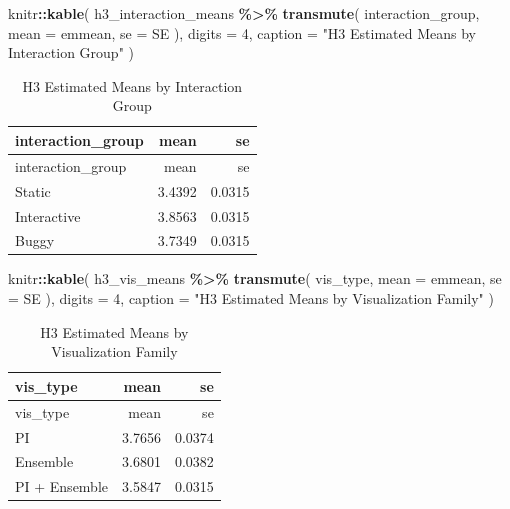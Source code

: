 \documentclass[
]{article}
\newenvironment{Shaded}{\begin{snugshade}}{\end{snugshade}}
\newcommand{\AttributeTok}[1]{\textcolor[rgb]{0.13,0.29,0.53}{#1}}
\newcommand{\DecValTok}[1]{\textcolor[rgb]{0.00,0.00,0.81}{#1}}
\newcommand{\FunctionTok}[1]{\textcolor[rgb]{0.13,0.29,0.53}{\textbf{#1}}}
\newcommand{\NormalTok}[1]{#1}
\newcommand{\SpecialCharTok}[1]{\textcolor[rgb]{0.81,0.36,0.00}{\textbf{#1}}}
\newcommand{\StringTok}[1]{\textcolor[rgb]{0.31,0.60,0.02}{#1}}
\begin{document}
\begin{Shaded}
\begin{Highlighting}[]
\NormalTok{knitr}\SpecialCharTok{::}\FunctionTok{kable}\NormalTok{(}
\NormalTok{  h3\_interaction\_means }\SpecialCharTok{\%\textgreater{}\%}
    \FunctionTok{transmute}\NormalTok{(}
\NormalTok{      interaction\_group,}
      \AttributeTok{mean =}\NormalTok{ emmean,}
      \AttributeTok{se =}\NormalTok{ SE}
\NormalTok{    ),}
  \AttributeTok{digits =} \DecValTok{4}\NormalTok{,}
  \AttributeTok{caption =} \StringTok{"H3 Estimated Means by Interaction Group"}
\NormalTok{)}
\end{Highlighting}
\end{Shaded}

\begin{longtable}[]{@{}lrr@{}}
\caption{H3 Estimated Means by Interaction Group}\tabularnewline
\toprule\noalign{}
interaction\_group & mean & se \\
\midrule\noalign{}
\endfirsthead
\toprule\noalign{}
interaction\_group & mean & se \\
\midrule\noalign{}
\endhead
\bottomrule\noalign{}
\endlastfoot
Static & 3.4392 & 0.0315 \\
Interactive & 3.8563 & 0.0315 \\
Buggy & 3.7349 & 0.0315 \\
\end{longtable}

\begin{Shaded}
\begin{Highlighting}[]
\NormalTok{knitr}\SpecialCharTok{::}\FunctionTok{kable}\NormalTok{(}
\NormalTok{  h3\_vis\_means }\SpecialCharTok{\%\textgreater{}\%}
    \FunctionTok{transmute}\NormalTok{(}
\NormalTok{      vis\_type,}
      \AttributeTok{mean =}\NormalTok{ emmean,}
      \AttributeTok{se =}\NormalTok{ SE}
\NormalTok{    ),}
  \AttributeTok{digits =} \DecValTok{4}\NormalTok{,}
  \AttributeTok{caption =} \StringTok{"H3 Estimated Means by Visualization Family"}
\NormalTok{)}
\end{Highlighting}
\end{Shaded}

\begin{longtable}[]{@{}lrr@{}}
\caption{H3 Estimated Means by Visualization Family}\tabularnewline
\toprule\noalign{}
vis\_type & mean & se \\
\midrule\noalign{}
\endfirsthead
\toprule\noalign{}
vis\_type & mean & se \\
\midrule\noalign{}
\endhead
\bottomrule\noalign{}
\endlastfoot
PI & 3.7656 & 0.0374 \\
Ensemble & 3.6801 & 0.0382 \\
PI + Ensemble & 3.5847 & 0.0315 \\
\end{longtable}
\end{document}
